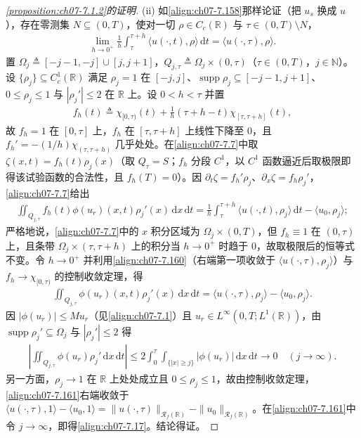 \documentclass[../../main.tex]{subfiles}%
\begin{document}
\begin{proof}[\cref{proposition:ch07-7.1.2}的证明]
(ii) 如\eqref{align:ch07-7.158}那样论证（把 $u_s$ 换成 $u$），存在零测集 $N\subseteq(0,T)$，使对一切 $\rho\in C_c(\mathbb{R})$ 与 $\tau\in(0,T)\setminus N$，
\begin{align}
\lim_{h\to0^+}\frac1h\int_\tau^{\tau+h}\langle u(\cdot,t),\rho\rangle\,\mathrm{d}t=\langle u(\cdot,\tau),\rho\rangle . \label{align:ch07-7.160}
\end{align}
置 $\Omega_j\triangleq[-j-1,-j]\cup[j,j+1]$，$Q_{j,\tau}\triangleq\Omega_j\times(0,\tau)$（$\tau\in(0,T)$，$j\in\mathbb{N}$）。设 $\{\rho_j\}\subseteq C_c^1(\mathbb{R})$ 满足 $\rho_j=1$ 在 $[-j,j]$、$\operatorname{supp}\rho_j\subseteq[-j-1,j+1]$、$0\leqslant\rho_j\leqslant1$ 与 $|\rho_j'|\leqslant2$ 在 $\mathbb{R}$ 上。设 $0<h<\tau$ 并置
\begin{align*}
f_h(t)\triangleq\chi_{[0,\tau)}(t)+\frac1h(\tau+h-t)\chi_{[\tau,\tau+h]}(t),
\end{align*}
故 $f_h=1$ 在 $[0,\tau]$ 上，$f_h$ 在 $[\tau,\tau+h]$ 上线性下降至 $0$，且 $f_h'=-(1/h)\chi_{(\tau,\tau+h)}$ 几乎处处。在\eqref{align:ch07-7.7}中取 $\zeta(x,t)=f_h(t)\rho_j(x)$（取 $Q_\tau=S$；$f_h$ 分段 $C^1$，以 $C^1$ 函数逼近后取极限即得该试验函数的合法性，且 $f_h(T)=0$）。因 $\partial_t\zeta=f_h'\rho_j$、$\partial_x\zeta=f_h\rho_j'$，\eqref{align:ch07-7.7}给出
\begin{align*}
\iint_{Q_{j,\tau}}f_h(t)\phi(u_r)(x,t)\rho_j'(x)\,\mathrm{d}x\,\mathrm{d}t=\frac1h\int_\tau^{\tau+h}\langle u(\cdot,t),\rho_j\rangle\,\mathrm{d}t-\langle u_0,\rho_j\rangle ;
\end{align*}
严格地说，\eqref{align:ch07-7.7}中的 $x$ 积分区域为 $\Omega_j\times(0,T)$，但 $f_h\equiv1$ 在 $(0,\tau)$ 上，且条带 $\Omega_j\times(\tau,\tau+h)$ 上的积分当 $h\to0^+$ 时趋于 $0$，故取极限后的恒等式不变。令 $h\to0^+$ 并利用\eqref{align:ch07-7.160}（右端第一项收敛于 $\langle u(\cdot,\tau),\rho_j\rangle$）与 $f_h\to\chi_{[0,\tau)}$ 的控制收敛定理，得
\begin{align}
\iint_{Q_{j,\tau}}\phi(u_r)(x,t)\rho_j'(x)\,\mathrm{d}x\,\mathrm{d}t=\langle u(\cdot,\tau),\rho_j\rangle-\langle u_0,\rho_j\rangle . \label{align:ch07-7.161}
\end{align}
因 $|\phi(u_r)|\leqslant Mu_r$（见\eqref{align:ch07-7.1}）且 $u_r\in L^\infty(0,T;L^1(\mathbb{R}))$，由 $\operatorname{supp}\rho_j'\subseteq\Omega_j$ 与 $|\rho_j'|\leqslant2$ 得
\begin{align*}
\left|\iint_{Q_{j,\tau}}\phi(u_r)\rho_j'\,\mathrm{d}x\,\mathrm{d}t\right|\leqslant2\int_0^\tau\int_{\{|x|\geqslant j\}}|\phi(u_r)|\,\mathrm{d}x\,\mathrm{d}t\to0\quad(j\to\infty).
\end{align*}
另一方面，$\rho_j\to1$ 在 $\mathbb{R}$ 上处处成立且 $0\leqslant\rho_j\leqslant1$，故由控制收敛定理，\eqref{align:ch07-7.161}右端收敛于 $\langle u(\cdot,\tau),1\rangle-\langle u_0,1\rangle=\|u(\cdot,\tau)\|_{\mathscr{R}_f(\mathbb{R})}-\|u_0\|_{\mathscr{R}_f(\mathbb{R})}$。在\eqref{align:ch07-7.161}中令 $j\to\infty$，即得\eqref{align:ch07-7.17}。结论得证。
\end{proof}
\end{document}
